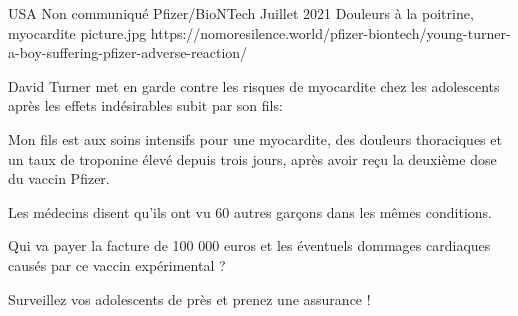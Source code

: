 {USA}
{Non communiqué}
{Pfizer/BioNTech}
{Juillet 2021}
{Douleurs à la poitrine, myocardite}
{picture.jpg}
{https://nomoresilence.world/pfizer-biontech/young-turner-a-boy-suffering-pfizer-adverse-reaction/}
{

David Turner met en garde contre les risques de myocardite chez les adolescents
après les effets indésirables subit par son fils:

Mon fils est aux soins intensifs pour une myocardite, des douleurs thoraciques
et un taux de troponine élevé depuis trois jours, après avoir reçu la deuxième
dose du vaccin Pfizer.

Les médecins disent qu'ils ont vu 60 autres garçons dans les mêmes conditions.

Qui va payer la facture de 100 000 euros et les éventuels dommages cardiaques
causés par ce vaccin expérimental ?

Surveillez vos adolescents de près et prenez une assurance !

}
